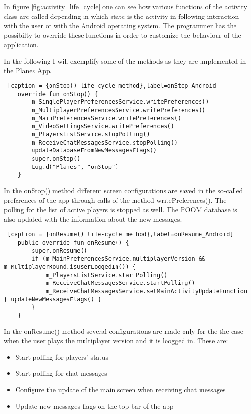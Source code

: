 In figure \ref{fig:activity_life_cycle} one can see how various functions of the activity class are called depending in which state is the activity in following interaction with the user or with the Android operating system. The programmer has the possibilty to override these functions in order to customize the behaviour of the application.

In the following I will exemplify some of the methods as they are implemented in the Planes App. 

\begin{lstlisting} [caption = {onStop() life-cycle method},label=onStop_Android]
	override fun onStop() {
		m_SinglePlayerPreferencesService.writePreferences()
		m_MultiplayerPreferencesService.writePreferences()
		m_MainPreferencesService.writePreferences()
		m_VideoSettingsService.writePreferences()
		m_PlayersListService.stopPolling()
		m_ReceiveChatMessagesService.stopPolling()
		updateDatabaseFromNewMessagesFlags()
		super.onStop()
		Log.d("Planes", "onStop")
	}
\end{lstlisting}

In the onStop() method different screen configurations are saved in the so-called preferences of the app through calls of the method writePreferences(). The polling for the list of active players is stopped as well. The ROOM database is also updated with the information about the new messages.

\begin{lstlisting} [caption = {onResume() life-cycle method},label=onResume_Android]
	public override fun onResume() {
		super.onResume()
		if (m_MainPreferencesService.multiplayerVersion && m_MultiplayerRound.isUserLoggedIn()) {
			m_PlayersListService.startPolling()
			m_ReceiveChatMessagesService.startPolling()
			m_ReceiveChatMessagesService.setMainActivityUpdateFunction { updateNewMessagesFlags() }
		}
	}
\end{lstlisting}

In the onResume() method several configurations are made only for the the case when the user plays the multiplayer version and it is loogged in. These are:

\begin{itemize}
	\item Start polling for players' status
	\item Start polling for chat messages
	\item Configure the update of the main screen when receiving chat messages
	\item Update new messages flags on the top bar of the app
\end{itemize}


